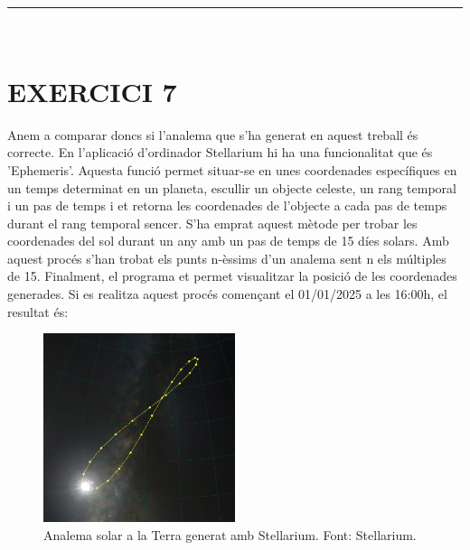 \documentclass[a4paper, 11pt]{article}
\begin{document}
\vspace{10mm}
\hrule\
\vspace{5mm}


\section*{EXERCICI 7}

\noindent Anem a comparar doncs si l'analema que s'ha generat en aquest treball és correcte. En l'aplicació d'ordinador Stellarium hi ha una funcionalitat que és 'Ephemeris'. Aquesta funció permet situar-se en unes coordenades específiques en un temps determinat en un planeta, escullir un objecte celeste, un rang temporal i un pas de temps i et retorna les coordenades de l'objecte a cada pas de temps durant el rang temporal sencer. S'ha emprat aquest mètode per trobar les coordenades del sol durant un any amb un pas de temps de 15 díes solars. Amb aquest procés s'han trobat els punts n-èssims d'un analema sent n els múltiples de 15. Finalment, el programa et permet visualitzar la posició de les coordenades generades. Si es realitza aquest procés començant el 01/01/2025 a les 16:00h, el resultat és:

\vspace{2mm}
\begin{figure}[h!]
    \centering
    \includegraphics[width=0.50\textwidth]{images/stellarium_terra_16.png}
    \caption{Analema solar a la Terra generat amb Stellarium. Font: Stellarium.}
    \label{fig:stellarium_terra_16}
\end{figure}
\vspace{2mm}
\end{document}

